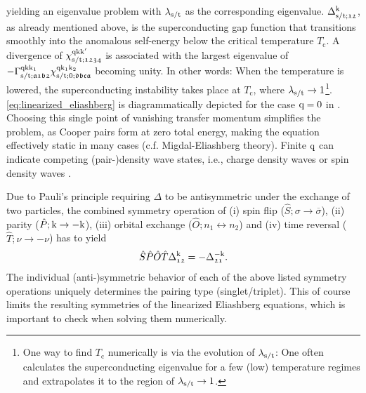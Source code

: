 \documentclass[../../main.tex]{subfiles}
\begin{document}
yielding an eigenvalue problem with $\lambda_{\text{s}/\text{t}}$ as the corresponding eigenvalue. $\Delta_{\text{s}/\text{t};\mathfrak{12}}^{\text{k}}$, as already mentioned above, is the superconducting gap function that transitions smoothly into the anomalous self-energy below the critical temperature $T_\mathrm{c}$. A divergence of $\chi^{\text{q}\text{k}\text{k}'}_{\text{s}/\text{t};\mathfrak{1234}}$ is associated with the largest eigenvalue of $-\Gamma^{\text{q}\text{k}\text{k}_1}_{\text{s}/\text{t};\mathfrak{a1b2}}\chi^{\text{q}\text{k}_1\text{k}_2}_{\text{s}/\text{t};0;\mathfrak{dbca}}$ becoming unity. In other words: When the temperature is lowered, the superconducting instability takes place at $T_\mathrm{c}$, where $\lambda_{\text{s}/\text{t}}\to 1$\footnote{One way to find $T_\mathrm{c}$ numerically is via the evolution of $\lambda_{\text{s}/\text{t}}$: One often calculates the superconducting eigenvalue for a few (low) temperature regimes and extrapolates it to the region of $\lambda_{\text{s}/\text{t}}\to 1$.}. \eqref{eq:linearized_eliashberg} is diagrammatically depicted for the case $\text{q}=0$ in . Choosing this single point of vanishing transfer momentum simplifies the problem, as Cooper pairs form at zero total energy, making the equation effectively static in many cases (c.f. Migdal-Eliashberg theory). Finite $\text{q}$ can indicate competing (pair-)density wave states, i.e., charge density waves or spin density waves \cite{yoshida pair density wave}.

Due to Pauli's principle requiring $\Delta$ to be antisymmetric under the exchange of two particles, the combined symmetry operation of (i) spin flip ($\hat S; \sigma\to\overline{\sigma}$), (ii) parity ($\hat P; \text{k}\to-\text{k}$), (iii) orbital exchange ($\hat O; n_1 \leftrightarrow n_2$) and (iv) time reversal ($\hat T; \nu\to-\nu$) has to yield
\begin{align}
	\hat S\hat P\hat O\hat T \Delta_{\mathfrak{12}}^{\text{k}} = -\Delta_{\mathfrak{21}}^{-\text{k}}.
\end{align}
The individual (anti-)symmetric behavior of each of the above listed symmetry operations uniquely determines the pairing type (singlet/triplet). This of course limits the resulting symmetries of the linearized Eliashberg equations, which is important to check when solving them numerically. 
\end{document}
